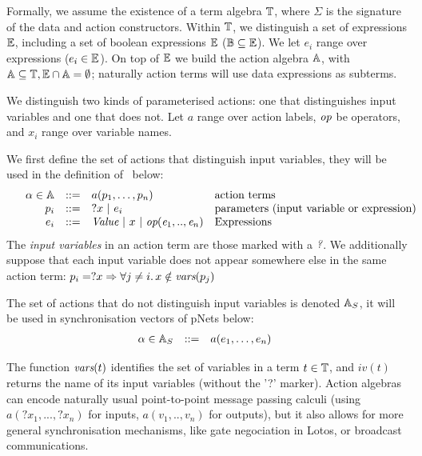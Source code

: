 \documentclass{lmcs}
\newcommand{\TODO}[1]{\textcolor{red}{\textbf{[TODO:#1]}}}
\begin{document}

Formally, we assume the existence of a term algebra $\mathbb{T}$,
where $\Sigma$ is the signature of the data and action constructors. Within $\mathbb{T}$, we distinguish a set of
 expressions $\mathbb{E}$, including a set of boolean
expressions $\mathbb{E}$ ($\mathbb{B}\subseteq\mathbb{E}$). We let $e_i$ range over expressions ($e_i\in\mathbb{E}$).
On top of $\mathbb{E}$ we build the action algebra
$\mathbb{A}$, with $\mathbb{A}\subseteq\mathbb{T},
\mathbb{E}\cap\mathbb{A}=\emptyset$;
naturally action terms will use data expressions as subterms.

We distinguish two kinds of parameterised actions: one that distinguishes input variables and one that does not. Let $a$
range over action labels, $\symb{op}$ be operators, and $x_i$ range over
variable names.

We first define the set of actions that distinguish input variables, they will be used in the definition of \pLTS\ below:
\[
\begin{array}[l]{rcl@{\quad}p{5.5cm}}
  \alpha\in\AlgA&::=&a(p_1,\ldots,p_n)&\text{action terms}\\
  p_i&::=& ?x~|~e_i&\text{parameters (input variable or expression)}\\
  e_i&::=& \symb{Value}~|~x~|~\symb{op}(\symb{e}_1,..,\symb{e}_n)&\text{Expressions}
\end{array}
\]
The \emph{input variables} in an action term are those marked with a
$\symb{?}$.
We additionally suppose that each input variable does not
appear somewhere else in the same action term:
$p_i=?x\Rightarrow\forall j\neq i.\, x\notin \vars(p_j)$

The set of actions that do not distinguish input variables is denoted $\mathbb{A}_S$, it will be used in synchronisation vectors of pNets below:
\[\begin{array}[l]{rcl@{\quad}l}
  \alpha\in \AlgAS &::=&a(e_1,\ldots,e_n)
\end{array}
\]

The function
$\vars(t)$ identifies the set of variables in a term
$t\in\mathbb{T}$, and $iv(t)$ returns the name of its input variables (without the '?' marker).
Action algebras can encode naturally usual point-to-point message passing calculi (using 
$a(?x_1,...,?x_n)$ for inputs, $a(v_1,..,v_n)$ for outputs), but it also allows
for more general synchronisation mechanisms, like gate negociation in Lotos, or broadcast
communications. 
\end{document}

